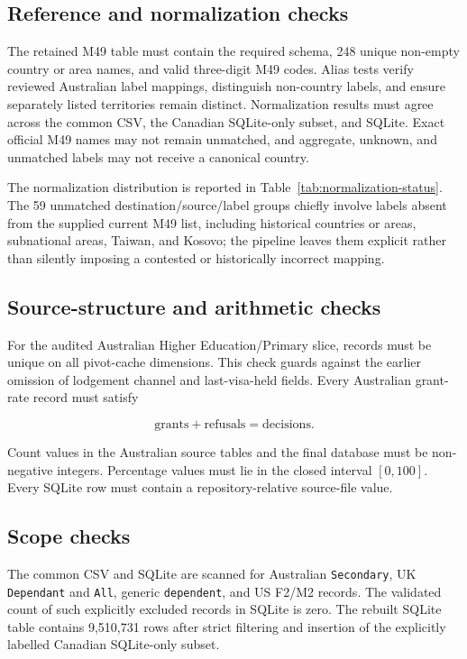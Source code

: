 \documentclass[runningheads]{llncs}
\begin{document}
\subsection{Reference and normalization checks}

The retained M49 table must contain the required schema, 248 unique non-empty country or area names, and valid three-digit M49 codes. Alias tests verify reviewed Australian label mappings, distinguish non-country labels, and ensure separately listed territories remain distinct. Normalization results must agree across the common CSV, the Canadian SQLite-only subset, and SQLite. Exact official M49 names may not remain unmatched, and aggregate, unknown, and unmatched labels may not receive a canonical country.

The normalization distribution is reported in Table~\ref{tab:normalization-status}. The 59 unmatched destination/source/label groups chiefly involve labels absent from the supplied current M49 list, including historical countries or areas, subnational areas, Taiwan, and Kosovo; the pipeline leaves them explicit rather than silently imposing a contested or historically incorrect mapping.

\subsection{Source-structure and arithmetic checks}

For the audited Australian Higher Education/Primary slice, records must be unique on all pivot-cache dimensions. This check guards against the earlier omission of lodgement channel and last-visa-held fields. Every Australian grant-rate record must satisfy

\begin{equation}
  \mathrm{grants} + \mathrm{refusals} = \mathrm{decisions}.
\end{equation}

Count values in the Australian source tables and the final database must be non-negative integers. Percentage values must lie in the closed interval $[0,100]$. Every SQLite row must contain a repository-relative source-file value.

\subsection{Scope checks}

The common CSV and SQLite are scanned for Australian \texttt{Secondary}, UK \texttt{Dependant} and \texttt{All}, generic \texttt{dependent}, and US F2/M2 records. The validated count of such explicitly excluded records in SQLite is zero. The rebuilt SQLite table contains 9,510,731 rows after strict filtering and insertion of the explicitly labelled Canadian SQLite-only subset.
\end{document}

